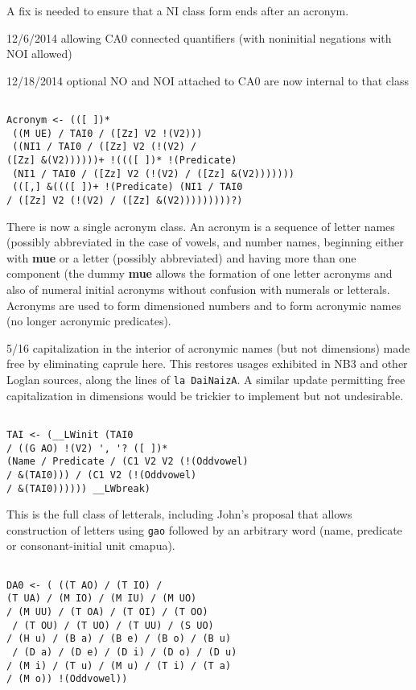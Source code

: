 \documentclass[12pt]{article}
\begin{document}
A fix is needed to ensure that a NI class form ends after an acronym.

12/6/2014 allowing CA0 connected quantifiers (with noninitial negations with NOI allowed)

12/18/2014  optional NO and NOI attached to CA0 are now internal to that class

\begin{verbatim}

Acronym <- (([ ])* 
 ((M UE) / TAI0 / ([Zz] V2 !(V2)))
 ((NI1 / TAI0 / ([Zz] V2 (!(V2) / 
([Zz] &(V2))))))+ !((([ ])* !(Predicate)
 (NI1 / TAI0 / ([Zz] V2 (!(V2) / ([Zz] &(V2)))))))
 (([,] &((([ ])+ !(Predicate) (NI1 / TAI0 
/ ([Zz] V2 (!(V2) / ([Zz] &(V2)))))))))?)

\end{verbatim}

There is now a single acronym class.  An acronym is a sequence of letter names (possibly abbreviated
in the case of vowels, and number names, beginning either with {\bf mue} or a letter (possibly abbreviated)
and having more than one component (the dummy {\bf mue} allows the formation of one letter acronyms
and also of numeral initial acronyms without confusion with numerals or letterals.   Acronyms are used
to form dimensioned numbers and to form acronymic names (no longer acronymic predicates).

5/16 capitalization in the interior of acronymic names (but not dimensions) made free by eliminating caprule here.  This
restores usages exhibited in NB3 and other Loglan sources, along the lines of {\tt la DaiNaizA}.   A similar update permitting
free capitalization in dimensions would be trickier to implement but not undesirable.

\begin{verbatim}

TAI <- (__LWinit (TAI0 
/ ((G AO) !(V2) ', '? ([ ])* 
(Name / Predicate / (C1 V2 V2 (!(Oddvowel) 
/ &(TAI0))) / (C1 V2 (!(Oddvowel) 
/ &(TAI0)))))) __LWbreak)

\end{verbatim}

This is the full class of letterals, including John's proposal that allows construction of letters using {\tt gao} followed
by an arbitrary word (name, predicate or consonant-initial unit cmapua).

\begin{verbatim}

DA0 <- ( ((T AO) / (T IO) / 
(T UA) / (M IO) / (M IU) / (M UO) 
/ (M UU) / (T OA) / (T OI) / (T OO)
 / (T OU) / (T UO) / (T UU) / (S UO) 
/ (H u) / (B a) / (B e) / (B o) / (B u)
 / (D a) / (D e) / (D i) / (D o) / (D u) 
/ (M i) / (T u) / (M u) / (T i) / (T a) 
/ (M o)) !(Oddvowel))

\end{verbatim}
\end{document}
